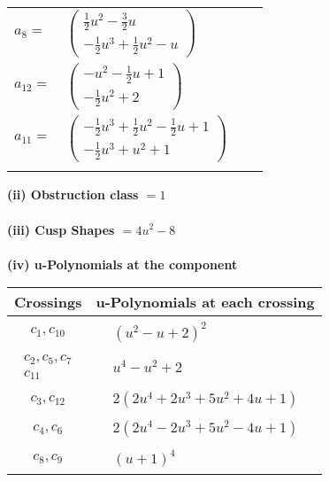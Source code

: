 \documentclass[1p]{elsarticle_modified}
\theoremstyle{definition}
\begin{document}
\begin{tabular}{m{7pt} m{180pt} m{7pt} m{180pt} }
\flushright $a_{8}=$&$\begin{pmatrix}\frac{1}{2} u^2-\frac{3}{2} u\\-\frac{1}{2} u^3+\frac{1}{2} u^2- u\end{pmatrix}$ \\
\flushright $a_{12}=$&$\begin{pmatrix}- u^2-\frac{1}{2} u+1\\-\frac{1}{2} u^2+2\end{pmatrix}$ \\
\flushright $a_{11}=$&$\begin{pmatrix}-\frac{1}{2} u^3+\frac{1}{2} u^2-\frac{1}{2} u+1\\-\frac{1}{2} u^3+u^2+1\end{pmatrix}$\\&\end{tabular}
\flushleft \textbf{(ii) Obstruction class $= 1$}\\~\\
\flushleft \textbf{(iii) Cusp Shapes $= 4 u^2-8$}\\~\\
\newpage\renewcommand{\arraystretch}{1}
\flushleft \textbf{(iv) u-Polynomials at the component}\newline \\
\begin{tabular}{m{50pt}|m{274pt}}
Crossings & \hspace{64pt}u-Polynomials at each crossing \\
\hline $$\begin{aligned}c_{1},c_{10}\end{aligned}$$&$\begin{aligned}
&(u^2- u+2)^2
\end{aligned}$\\
\hline $$\begin{aligned}c_{2},c_{5},c_{7}\\c_{11}\end{aligned}$$&$\begin{aligned}
&u^4- u^2+2
\end{aligned}$\\
\hline $$\begin{aligned}c_{3},c_{12}\end{aligned}$$&$\begin{aligned}
&2(2 u^4+2 u^3+5 u^2+4 u+1)
\end{aligned}$\\
\hline $$\begin{aligned}c_{4},c_{6}\end{aligned}$$&$\begin{aligned}
&2(2 u^4-2 u^3+5 u^2-4 u+1)
\end{aligned}$\\
\hline $$\begin{aligned}c_{8},c_{9}\end{aligned}$$&$\begin{aligned}
&(u+1)^4
\end{aligned}$\\
\hline
\end{tabular}\\~\\
\end{document}
